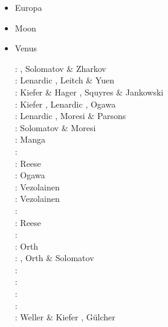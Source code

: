 \begin{itemize}

\item Europa 
\begin{scriptsize}
\cite{shha04,shha05,mish05,hash08}\cite{hash10}\cite{hash11,kast14,almc19}
\end{scriptsize}

\item Moon 
\begin{scriptsize}
\cite{elvh02}\cite{elhg04}\cite{devv10}\cite{dejv13} \cite{zhdv19}
\end{scriptsize}
 
\item Venus 
\begin{scriptsize}
\nineteenninety: \cite{scbg90}, Solomatov \& Zharkov \cite{sozh90}\\
\nineteenninetyone: Lenardic \etal \cite{lekb91}, Leitch \& Yuen \cite{leyu91}\\
\nineteenninetytwo: Kiefer \& Hager \cite{kiha92}, Squyres \& Jankowski \cite{sqjs92}\\
\nineteenninetythree: Kiefer \cite{kief93}, Lenardic \etal \cite{lekb93}, Ogawa \cite{ogaw93}\\ 
\nineteenninetyfive: Lenardic \etal \cite{lekb95}, Moresi \& Parsons \cite{mopa95}\\
\nineteenninetysix: Solomatov \& Moresi \cite{somo96}\\
\nineteenninetyseven: Manga \cite{mang97} \\
\nineteenninetyeight: \cite{mazk98}\cite{resm98}\cite{moso98}\cite{phha98}\\
\nineteenninetynine: Reese \etal \cite{resm99}\\
\twothousand: Ogawa \cite{ogaw00} \\
\twothousandthree: Vezolainen \etal \cite{vesh03}\\
\twothousandfour: Vezolainen \etal \cite{vesb04}\\
\twothousandfive: \cite{vavv05}\\
\twothousandseven: Reese \etal \cite{reso07}\\
\twothousandten: \cite{stfh10}\\
\twothousandeleven: Orth \etal \cite{orso11}\\
\twothousandtwelve: \cite{arta12}, Orth \& Solomatov \cite{orso12}\\
\twothousandthirteen: \cite{huyz13}\\
\twothousandfourteen: \cite{gita14}\cite{gery14b}\\
\twothousandseventeen: \cite{cram17}\cite{dast17}\\
\twothousandeighteen: \cite{king18}\\
\twothousandtwenty: Weller \& Kiefer \cite{weki20}, G{\"u}lcher \etal \cite{gugm20}
\end{scriptsize}


\end{itemize}
